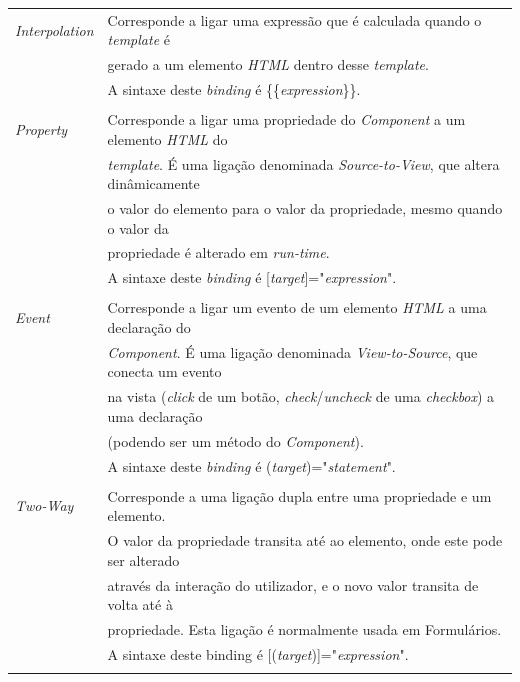 \begin{tabular}{ll}
	\emph{Interpolation} & Corresponde a ligar uma expressão que é calculada quando o \textit{template} é \\
	& gerado a um elemento \textit{HTML} dentro desse \textit{template}. \\
	& A sintaxe deste \textit{binding} é {\{\{\textit{expression}\}\}}. \\
	\\
	\emph{Property} & Corresponde a ligar uma propriedade do \textit{Component} a um elemento \textit{HTML} do \\
	& \textit{template}. É uma ligação denominada \textit{Source-to-View}, que altera dinâmicamente \\
	& o valor do elemento para o valor da propriedade, mesmo quando o valor da \\
	&propriedade é alterado em \textit{run-time}. \\
	& A sintaxe deste \textit{binding} é [\textit{target}]="\textit{expression}".\\
	\\
	\emph{Event} & Corresponde a ligar um evento de um elemento \textit{HTML} a uma declaração do \\
	& \textit{Component}. É uma ligação denominada \textit{View-to-Source}, que conecta um evento \\
	&na vista (\textit{click} de um botão, \textit{check}/\textit{uncheck} de uma \textit{checkbox}) a uma declaração \\
	&(podendo ser um método do \textit{Component}). \\
	& A sintaxe deste \textit{binding} é (\textit{target})="\textit{statement}".\\
	\\
	\emph{Two-Way} & Corresponde a uma ligação dupla entre uma propriedade e um elemento. \\
	& O valor da propriedade transita até ao elemento, onde este pode ser alterado \\
	&através da interação do utilizador, e o novo valor transita de volta até à \\
	&propriedade. Esta ligação é normalmente usada em Formulários. \\
	&A sintaxe deste binding é [(\textit{target})]="\textit{expression}".\\
	\\
\end{tabular}

\newpage

